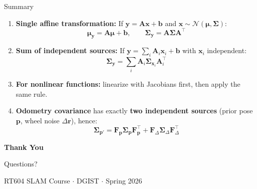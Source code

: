\documentclass[aspectratio=169, 11pt]{beamer}
\newcommand{\T}{^{\top}}
\begin{document}
\begin{frame}{Summary}

\begin{enumerate}
\setlength{\itemsep}{10pt}

\item \textbf{Single affine transformation:} If $\mathbf{y} = \mathbf{A}\mathbf{x} + \mathbf{b}$ and $\mathbf{x} \sim \mathcal{N}(\bm{\mu}, \bm{\Sigma})$:
$$\bm{\mu}_{\mathbf{y}} = \mathbf{A}\bm{\mu} + \mathbf{b}, \qquad \bm{\Sigma}_{\mathbf{y}} = \mathbf{A}\bm{\Sigma}\mathbf{A}\T$$

\item \textbf{Sum of independent sources:} If $\mathbf{y} = \sum_i \mathbf{A}_i \mathbf{x}_i + \mathbf{b}$ with $\mathbf{x}_i$ independent:
$$\bm{\Sigma}_{\mathbf{y}} = \sum_i \mathbf{A}_i \bm{\Sigma}_{\mathbf{x}_i} \mathbf{A}_i\T$$

\item \textbf{For nonlinear functions:} linearize with Jacobians first, then apply the same rule.

\item \textbf{Odometry covariance} has exactly \textbf{two independent sources}
(prior pose $\mathbf{p}$, wheel noise $\Delta\mathbf{r}$), hence:
$$\bm{\Sigma}_{\mathbf{p}'} = \mathbf{F}_\mathbf{p}\bm{\Sigma}_{\mathbf{p}}\mathbf{F}_\mathbf{p}\T + \mathbf{F}_\Delta\bm{\Sigma}_\Delta\mathbf{F}_\Delta\T$$

\end{enumerate}
\end{frame}

{
\begin{frame}
\begin{center}
\vspace{2cm}
{\Huge\bfseries\color{dgistnavy} Thank You}

\vspace{1cm}

{\large Questions?}

\vspace{1.5cm}
{\small RT604 SLAM Course $\cdot$ DGIST $\cdot$ Spring 2026}
\end{center}
\end{frame}
}
\end{document}
